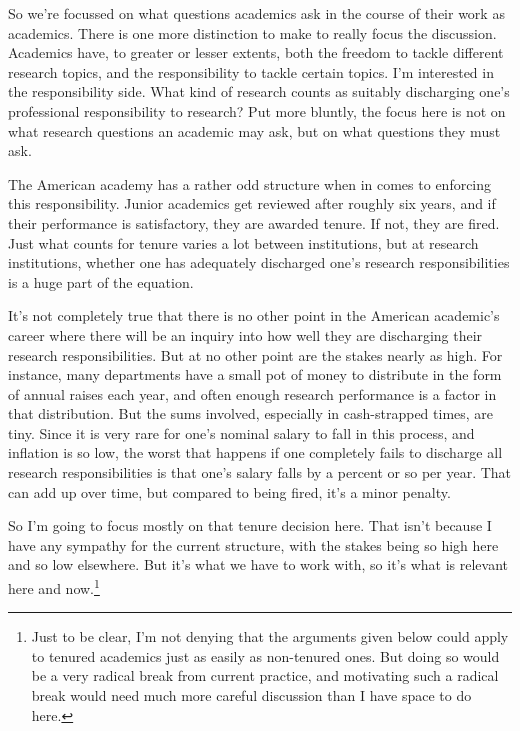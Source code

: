 \documentclass[
  11pt,
  letterpaper,
  DIV=11,
  numbers=noendperiod,
  twoside]{scrartcl}
\begin{document}
So we're focussed on what questions academics ask in the course of their
work as academics. There is one more distinction to make to really focus
the discussion. Academics have, to greater or lesser extents, both the
freedom to tackle different research topics, and the responsibility to
tackle certain topics. I'm interested in the responsibility side. What
kind of research counts as suitably discharging one's professional
responsibility to research? Put more bluntly, the focus here is not on
what research questions an academic may ask, but on what questions they
must ask.

The American academy has a rather odd structure when in comes to
enforcing this responsibility. Junior academics get reviewed after
roughly six years, and if their performance is satisfactory, they are
awarded tenure. If not, they are fired. Just what counts for tenure
varies a lot between institutions, but at research institutions, whether
one has adequately discharged one's research responsibilities is a huge
part of the equation.

It's not completely true that there is no other point in the American
academic's career where there will be an inquiry into how well they are
discharging their research responsibilities. But at no other point are
the stakes nearly as high. For instance, many departments have a small
pot of money to distribute in the form of annual raises each year, and
often enough research performance is a factor in that distribution. But
the sums involved, especially in cash-strapped times, are tiny. Since it
is very rare for one's nominal salary to fall in this process, and
inflation is so low, the worst that happens if one completely fails to
discharge all research responsibilities is that one's salary falls by a
percent or so per year. That can add up over time, but compared to being
fired, it's a minor penalty.

So I'm going to focus mostly on that tenure decision here. That isn't
because I have any sympathy for the current structure, with the stakes
being so high here and so low elsewhere. But it's what we have to work
with, so it's what is relevant here and now.\footnote{Just to be clear,
  I'm not denying that the arguments given below could apply to tenured
  academics just as easily as non-tenured ones. But doing so would be a
  very radical break from current practice, and motivating such a
  radical break would need much more careful discussion than I have
  space to do here.}
\end{document}
